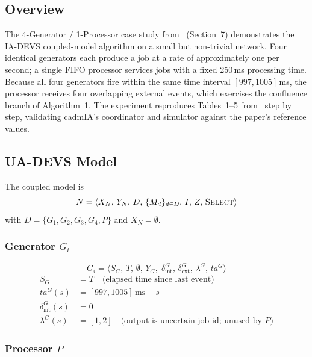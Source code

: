 \subsection*{Overview}

The 4-Generator / 1-Processor case study from~\cite{VDW21} (Section~7)
demonstrates the IA-DEVS coupled-model algorithm on a small but non-trivial
network.  Four identical generators each produce a job at a rate of
approximately one per second; a single FIFO processor services jobs with a
fixed 250\,ms processing time.  Because all four generators fire within the
same time interval $[997,1005]$\,ms, the processor receives four overlapping
external events, which exercises the confluence branch of Algorithm~1.
The experiment reproduces Tables~1--5 from~\cite{VDW21} step by step,
validating cadmIA's coordinator and simulator against the paper's reference
values.

\subsection*{UA-DEVS Model}

The coupled model is
\[
  N = \langle X_N,\, Y_N,\, D,\, \{M_d\}_{d \in D},\, I,\, Z,\,
      \textsc{Select} \rangle
\]
with $D = \{G_1, G_2, G_3, G_4, P\}$ and $X_N = \emptyset$.

\subsubsection*{Generator $G_i$}

\[
  G_i = \langle S_G,\, T,\, \emptyset,\, Y_G,\;
        \delta^G_{\text{int}},\, \delta^G_{\text{ext}},\,
        \lambda^G,\, ta^G \rangle
\]
\begin{align*}
  S_G    &= T \quad\text{(elapsed time since last event)}\\
  ta^G(s) &= [997,1005]\,\text{ms} - s \\
  \delta^G_{\text{int}}(s) &= 0 \\
  \lambda^G(s) &= [1, 2]
    \quad\text{(output is uncertain job-id; unused by $P$)}
\end{align*}

\subsubsection*{Processor $P$}

